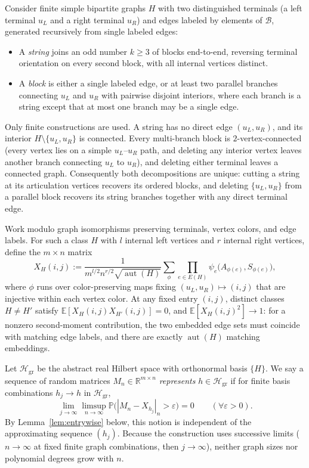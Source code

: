 \documentclass[11pt]{article}
\theoremstyle{plain}
\theoremstyle{definition}
\theoremstyle{remark}
\DeclareMathOperator{\aut}{aut}
\newcommand{\E}{\mathbb{E}}
\newcommand{\Prob}{\mathbb{P}}
\newcommand{\R}{\mathbb{R}}
\begin{document}
Consider finite simple bipartite graphs $H$ with two distinguished terminals (a left terminal $u_L$ and a right terminal $u_R$) and edges labeled by elements of $\mathcal{B}$, generated recursively from single labeled edges:
\begin{itemize}[leftmargin=2em,itemsep=2pt]
\item A \emph{string} joins an odd number $k \ge 3$ of blocks end-to-end, reversing terminal orientation on every second block, with all internal vertices distinct.
\item A \emph{block} is either a single labeled edge, or at least two parallel branches connecting $u_L$ and $u_R$ with pairwise disjoint interiors, where each branch is a string except that at most one branch may be a single edge.
\end{itemize}
Only finite constructions are used. A string has no direct edge $(u_L, u_R)$, and its interior $H \setminus \{u_L, u_R\}$ is connected. Every multi-branch block is $2$-vertex-connected (every vertex lies on a simple $u_L$--$u_R$ path, and deleting any interior vertex leaves another branch connecting $u_L$ to $u_R$), and deleting either terminal leaves a connected graph. Consequently both decompositions are unique: cutting a string at its articulation vertices recovers its ordered blocks, and deleting $\{u_L, u_R\}$ from a parallel block recovers its string branches together with any direct terminal edge.

Work modulo graph isomorphisms preserving terminals, vertex colors, and edge labels. For such a class $H$ with $l$ internal left vertices and $r$ internal right vertices, define the $m \times n$ matrix
\begin{equation}\label{eq:XH}
X_H(i, j) := \frac{1}{m^{l/2} n^{r/2}\sqrt{\aut(H)}}
\sum_{\phi} \prod_{e \in E(H)} \psi_e\bigl(A_{\phi(e)}, S_{\phi(e)}\bigr),
\end{equation}
where $\phi$ runs over color-preserving maps fixing $(u_L, u_R) \mapsto (i, j)$ that are injective within each vertex color.
At any fixed entry $(i,j)$, distinct classes $H \neq H'$ satisfy $\E[X_H(i,j) X_{H'}(i,j)] = 0$, and $\E[X_H(i,j)^2] \to 1$: for a nonzero second-moment contribution, the two embedded edge sets must coincide with matching edge labels, and there are exactly $\aut(H)$ matching embeddings.

Let $\mathcal{H}_{\mathrm{gr}}$ be the abstract real Hilbert space with orthonormal basis $\{H\}$. We say a sequence of random matrices $M_n \in \R^{m\times n}$ \emph{represents} $h \in \mathcal{H}_{\mathrm{gr}}$ if for finite basis combinations $h_j \to h$ in $\mathcal{H}_{\mathrm{gr}}$,
\[
\lim_{j\to\infty}\limsup_{n\to\infty}\Prob\bigl(|M_n - X_{h_j}|_n > \varepsilon\bigr) = 0
\qquad (\forall \varepsilon > 0).
\]
By Lemma~\ref{lem:entrywise} below, this notion is independent of the approximating sequence $(h_j)$. Because the construction uses successive limits ($n \to \infty$ at fixed finite graph combinations, then $j \to \infty$), neither graph sizes nor polynomial degrees grow with $n$.
\end{document}
